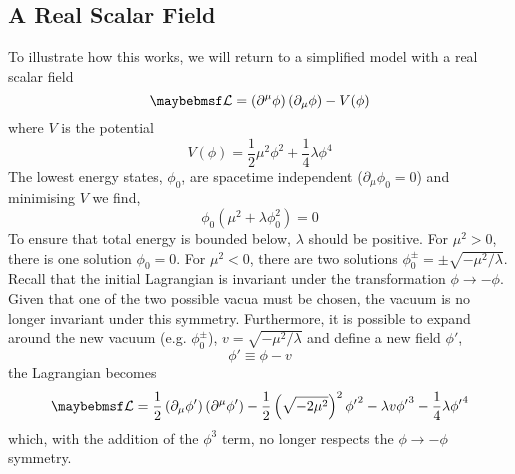 \subsection{A Real Scalar Field}
To illustrate how this works, we will return to a simplified model with a real
scalar field
\begin{equation}
\lagrangiand = \left(\partial^{\mu}\phi\right)\left(\partial_{\mu}\phi\right)
-V(\phi)
\end{equation}
where $V$ is the potential
\begin{equation}
V(\phi) = \frac{1}{2}\mu^2\phi^2 + \frac{1}{4}\lambda\phi^4
\end{equation}
The lowest energy states, $\phi_0$, are spacetime independent ($\partial_{\mu}
\phi_0 = 0$) and minimising $V$ we find,
\begin{equation}
\phi_0 \left (\mu^2 + \lambda\phi_0^2\right) = 0
\end{equation}
To ensure that total energy is bounded below, $\lambda$ should be positive. For
$\mu^2 > 0$, there is one solution $\phi_0 = 0$. For $\mu^2 < 0$, there are two
solutions $\phi^\pm_0 = \pm \sqrt{-\mu^2/\lambda}$. Recall that the initial
Lagrangian is invariant under the transformation $\phi \longrightarrow
-\phi$. Given that one of the two possible vacua must be chosen, the vacuum is
no longer invariant under this symmetry. Furthermore, it is possible to expand
around the new vacuum (e.g. $\phi_0^\pm$), $v=\sqrt{-\mu^2/\lambda}$ and define
a new field $\phi'$,
\begin{equation}
\phi' \equiv \phi - v
\end{equation}
the Lagrangian becomes
\begin{equation}
\lagrangiand = \frac{1}{2}
\left(\partial_{\mu}\phi'\right)\left(\partial^{\mu}\phi'\right)
-\frac{1}{2}\left(\sqrt{-2\mu^2}\right)^2{\phi'}^2 - \lambda v {\phi'}^3
-\frac{1}{4}\lambda{\phi'}^4
\end{equation}
which, with the addition of the $\phi^3$ term, no longer respects the $\phi
\longrightarrow -\phi$ symmetry.

